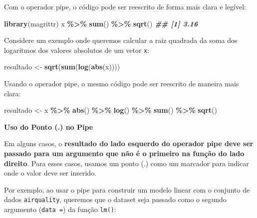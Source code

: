 \documentclass[
]{book}
\newenvironment{Shaded}{\begin{snugshade}}{\end{snugshade}}
\newcommand{\DocumentationTok}[1]{\textcolor[rgb]{0.56,0.35,0.01}{\textbf{\textit{#1}}}}
\newcommand{\FunctionTok}[1]{\textcolor[rgb]{0.13,0.29,0.53}{\textbf{#1}}}
\newcommand{\NormalTok}[1]{#1}
\newcommand{\OtherTok}[1]{\textcolor[rgb]{0.56,0.35,0.01}{#1}}
\newcommand{\SpecialCharTok}[1]{\textcolor[rgb]{0.81,0.36,0.00}{\textbf{#1}}}
\begin{document}
Com o operador pipe, o código pode ser reescrito de forma mais clara e
legível:

\begin{Shaded}
\begin{Highlighting}[]
\FunctionTok{library}\NormalTok{(magrittr)}
\NormalTok{x }\SpecialCharTok{\%\textgreater{}\%} \FunctionTok{sum}\NormalTok{() }\SpecialCharTok{\%\textgreater{}\%} \FunctionTok{sqrt}\NormalTok{()}
\DocumentationTok{\#\# [1] 3.16}
\end{Highlighting}
\end{Shaded}

Considere um exemplo onde queremos calcular a raiz quadrada da soma dos
logaritmos dos valores absolutos de um vetor \texttt{x}:

\begin{Shaded}
\begin{Highlighting}[]
\NormalTok{resultado }\OtherTok{\textless{}{-}} \FunctionTok{sqrt}\NormalTok{(}\FunctionTok{sum}\NormalTok{(}\FunctionTok{log}\NormalTok{(}\FunctionTok{abs}\NormalTok{(x))))}
\end{Highlighting}
\end{Shaded}

Usando o operador pipe, o mesmo código pode ser reescrito de maneira
mais clara:

\begin{Shaded}
\begin{Highlighting}[]
\NormalTok{resultado }\OtherTok{\textless{}{-}}\NormalTok{ x }\SpecialCharTok{\%\textgreater{}\%} 
  \FunctionTok{abs}\NormalTok{() }\SpecialCharTok{\%\textgreater{}\%} 
  \FunctionTok{log}\NormalTok{() }\SpecialCharTok{\%\textgreater{}\%} 
  \FunctionTok{sum}\NormalTok{() }\SpecialCharTok{\%\textgreater{}\%} 
  \FunctionTok{sqrt}\NormalTok{()}
\end{Highlighting}
\end{Shaded}

\textbf{Uso do Ponto (.) no Pipe}

Em alguns casos, o \textbf{resultado do lado esquerdo do operador pipe deve ser passado para um argumento que não é o primeiro na função do lado direito}. Para esses casos, usamos um ponto (.) como um marcador para indicar onde o valor deve ser inserido.

Por exemplo, ao usar o pipe para construir um modelo linear com o
conjunto de dados \texttt{airquality}, queremos que o dataset seja passado como
o segundo argumento (\texttt{data\ =}) da função \texttt{lm()}:
\end{document}
